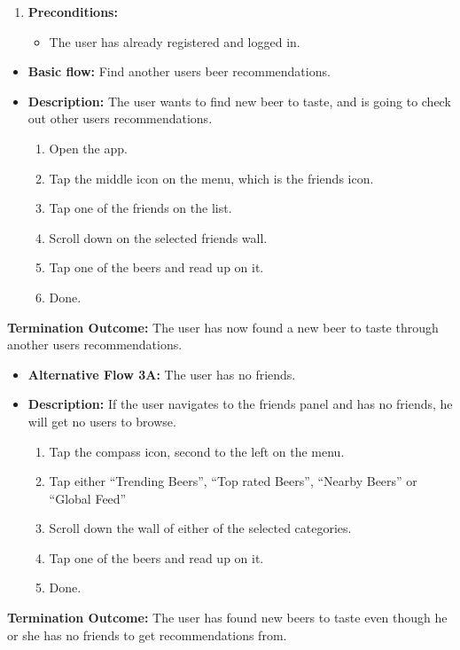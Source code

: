 \documentclass[12pt]{article}
\begin{document}
\begin{enumerate}[leftmargin=-0in]
  \item[] \textbf{Preconditions:} 
    \begin{itemize}
      \item The user has already registered and logged in.
    \end{itemize}
\end{enumerate}
\begin{itemize}[leftmargin=-0in]
  \item[] \textbf{Basic flow:} Find another users beer recommendations.
  \item[] \textbf{Description:} The user wants to find new beer to taste, and is
    going to check out other users recommendations.
    \begin{enumerate}
      \item Open the app.
      \item Tap the middle icon on the menu, which is the friends icon.
      \item Tap one of the friends on the list.
      \item Scroll down on the selected friends wall.
      \item Tap one of the beers and read up on it.
      \item Done. 
    \end{enumerate}
\end{itemize}
\textbf{Termination Outcome:} The user has now found a new beer to taste through
another users recommendations.


\begin{itemize}[leftmargin=-0in]
  \item[] \textbf{Alternative Flow 3A:} The user has no friends.
  \item[] \textbf{Description:} If the user navigates to the friends panel and
    has no friends, he will get no users to browse.
    \begin{enumerate}
      \item Tap the compass icon, second to the left on the menu.
      \item Tap either “Trending Beers”, “Top rated Beers”, “Nearby Beers” or “Global Feed” 
      \item Scroll down the wall of either of the selected categories.
      \item Tap one of the beers and read up on it.
      \item Done.
    \end{enumerate}
\end{itemize}
\textbf{Termination Outcome:} The user has found new beers to taste even though he or she has no friends to get recommendations from.
\end{document}
